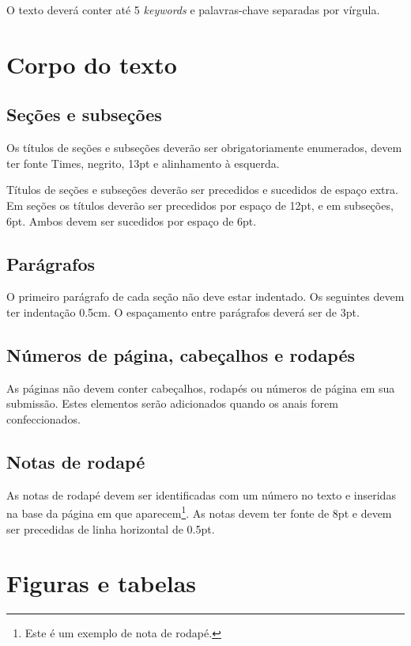 \documentclass[12pt]{article}
\begin{document}
O texto deverá conter até 5 \textit{keywords} e palavras-chave
separadas por vírgula.

\section{Corpo do texto}

\subsection{Seções e subseções}
\label{sec:secoes}

Os títulos de seções e subseções deverão ser obrigatoriamente
enumerados, devem ter fonte Times, negrito, 13pt e alinhamento à
esquerda.

Títulos de seções e subseções deverão ser precedidos e sucedidos de
espaço extra. Em seções os títulos deverão ser precedidos por espaço
de 12pt, e em subseções, 6pt. Ambos devem ser sucedidos por espaço de
6pt.

\subsection{Parágrafos}
\label{sec:paragrafos}

O primeiro parágrafo de cada seção não deve estar indentado. Os
seguintes devem ter indentação 0.5cm. O espaçamento entre parágrafos
deverá ser de 3pt.

\subsection{Números de página, cabeçalhos e rodapés}

As páginas não devem conter cabeçalhos, rodapés ou números de página
em sua submissão. Estes elementos serão adicionados quando os anais
forem confeccionados.

\subsection{Notas de rodapé}

As notas de rodapé devem ser identificadas com um número no texto e
inseridas na base da página em que aparecem\footnote{Este é um exemplo
  de nota de rodapé.}. As notas devem ter fonte de 8pt e devem ser
precedidas de linha horizontal de 0.5pt.

\section{Figuras e tabelas}
\label{sec:figuras-e-tabelas}
\end{document}
